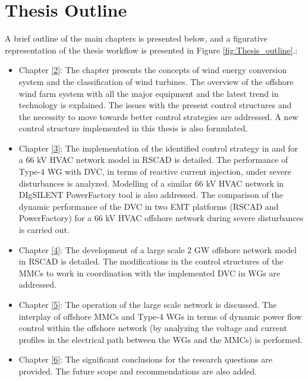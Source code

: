 \section{Thesis Outline}
A brief outline of the main chapters is presented below, and a figurative representation of the thesis workflow is presented in Figure \ref{fig:Thesis_outline}.:
\begin{itemize}
    \item Chapter \ref{2}: The chapter presents the concepts of wind energy conversion system and the classification of wind turbines. The overview of the offshore wind farm system with all the major equipment and the latest trend in technology is explained. The issues with the present control structures and the necessity to move towards better control strategies are addressed. A new control structure implemented in this thesis is also formulated.  
    
    \item Chapter \ref{3}: The implementation of the identified control strategy in \cite{korai_dynamic_2019} and \cite{sethi_real-time_nodate-new} for a 66 kV \gls{HVAC} network model in RSCAD is detailed. The performance of Type-4 \gls{WG} with \gls{DVC}, in terms of reactive current injection, under severe disturbances is analyzed. Modelling of a similar 66 kV \gls{HVAC} network in DIgSILENT PowerFactory tool is also addressed. The comparison of the dynamic performance of the \gls{DVC} in two \gls{EMT} platforms (RSCAD and PowerFactory) for a 66 kV \gls{HVAC} offshore network during severe disturbances is carried out. 
    
    \item Chapter \ref{4}: The development of a large scale 2 GW offshore network model in RSCAD is detailed. The modifications in the control structures of the \gls{MMC}s to work in coordination with the implemented \gls{DVC} in \gls{WG}s are addressed.
    
    \item Chapter \ref{5}: The operation of the large scale network is discussed. The interplay of offshore \gls{MMC}s and Type-4 \gls{WG}s in terms of dynamic power flow control within the offshore network (by analyzing the voltage and current profiles in the electrical path between the \gls{WG}s and the \gls{MMC}s) is performed. 
    
    \item Chapter \ref{6}: The significant conclusions for the research questions are provided. The future scope and recommendations are also added.
\end{itemize}

